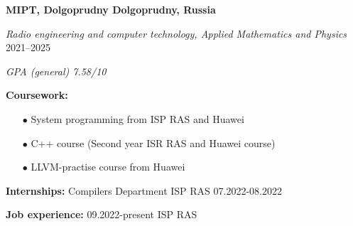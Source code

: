 \textbf{MIPT, Dolgoprudny \hfill Dolgoprudny, Russia} \par
\textit{Radio engineering and computer technology, Applied Mathematics and Physics} \hfill 2021--2025\par
\textit{GPA (general) 7.58/10} \par
\textbf{Coursework:}
\begin{enumerate}
    \item[$\bullet$] System programming from ISP RAS and Huawei
    \item[$\bullet$] C++ course (Second year ISR RAS and Huawei course)
    \item[$\bullet$] LLVM-practise course from Huawei
\end{enumerate}
\textbf{Internships:} Compilers Department ISP RAS 07.2022-08.2022 \par
\textbf{Job experience:} 09.2022-present ISP RAS